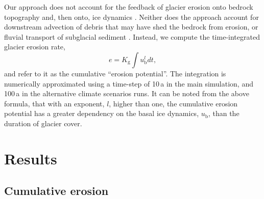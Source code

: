 \documentclass[esurf, manuscript]{copernicus}
\begin{document}
    Our approach does not account for the feedback of glacier erosion onto
    bedrock topography and, then onto, ice dynamics
    \citep[e.g.,][]{Anderson.etal.2012}. Neither does the approach account for
    downstream advection of debris \citep[e.g.,][]{Anderson.Anderson.2016} that
    may have shed the bedrock from erosion, or fluvial transport of subglacial
    sediment \citep{Delaney.etal.2019}. Instead, we compute the time-integrated
    glacier erosion rate,
    \begin{equation}
        e =  K_\mathrm{g} \int u_\mathrm{b}^l dt,
    \end{equation}
    and refer to it as the cumulative ``erosion potential''. The integration
    is numerically approximated using a time-step of 10\,a in the
    main simulation, and 100\,a in the alternative climate scenarios runs. It
    can be noted from the above formula, that with an exponent, $l$,
    higher than one, the cumulative erosion potential has a greater dependency
    on the basal ice dynamics, $u_\mathrm{b}$, than the duration of glacier
    cover.


\section{Results}

\subsection{Cumulative erosion}
\end{document}

